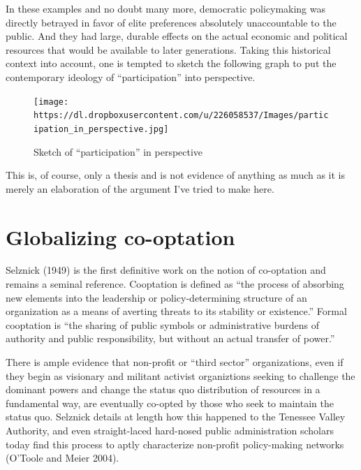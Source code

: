 \documentclass[12pt,book]{article}
\begin{document}
In these examples and no doubt many more, democratic policymaking was
directly betrayed in favor of elite preferences absolutely unaccountable
to the public. And they had large, durable effects on the actual
economic and political resources that would be available to later
generations. Taking this historical context into account, one is tempted
to sketch the following graph to put the contemporary ideology of
``participation'' into perspective.

\begin{figure}[htbp]
\centering
\texttt{[image: https://dl.dropboxusercontent.com/u/226058537/Images/participation\_in\_perspective.jpg]}
\caption{Sketch of ``participation'' in perspective}
\end{figure}

This is, of course, only a thesis and is not evidence of anything as
much as it is merely an elaboration of the argument I've tried to make
here.

\section{Globalizing co-optation}\label{globalizing-co-optation}

Selznick (1949) is the first definitive work on the notion of
co-optation and remains a seminal reference. Cooptation is defined as
``the process of absorbing new elements into the leadership or
policy-determining structure of an organization as a means of averting
threats to its stability or existence.'' Formal cooptation is ``the
sharing of public symbols or administrative burdens of authority and
public responsibility, but without an actual transfer of power.''

There is ample evidence that non-profit or ``third sector''
organizations, even if they begin as visionary and militant activist
organiztions seeking to challenge the dominant powers and change the
status quo distribution of resources in a fundamental way, are
eventually co-opted by those who seek to maintain the status quo.
Selznick details at length how this happened to the Tenessee Valley
Authority, and even straight-laced hard-nosed public administration
scholars today find this process to aptly characterize non-profit
policy-making networks (O'Toole and Meier 2004).
\end{document}
